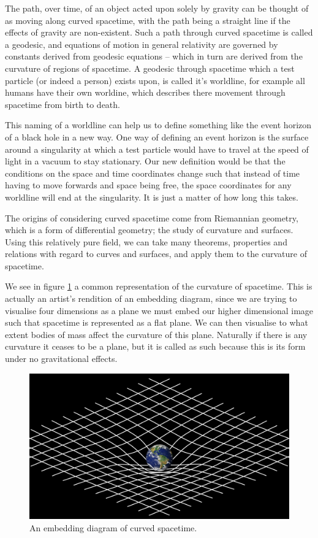 \documentclass[oneside,openright,frontopenright, singlespacing]{dmathesis}
\begin{document}
\vspace{1em}
	The path, over time, of an object acted upon solely by gravity can be thought of as moving along curved spacetime, with the path being a straight line if the effects of gravity are non-existent. Such a path through curved spacetime is called a geodesic, and equations of motion in general relativity are governed by constants derived from geodesic equations – which in turn are derived from the curvature of regions of spacetime. A geodesic through spacetime which a test particle (or indeed a person) exists upon, is called it's worldline, for example all humans have their own worldine, which describes there movement through spacetime from birth to death.

\vspace{1em}
	This naming of a worldline can help us to define something like the event horizon of a black hole in a new way. One way of defining an event horizon is the surface around a singularity at which a test particle would have to travel at the speed of light in a vacuum to stay stationary. Our new definition would be that the conditions on the space and time coordinates change such that instead of time having to move forwards and space being free, the space coordinates for any worldline will end at the singularity. It is just a matter of how long this takes.

\vspace{1em}
	The origins of considering curved spacetime come from Riemannian geometry, which is a form of differential geometry; the study of curvature and surfaces. Using this relatively pure field, we can take many theorems, properties and relations with regard to curves and surfaces, and apply them to the curvature of spacetime.

\vspace{1em}
		We see in figure \ref{fig:Figure2.1} a common representation of the curvature of spacetime. This is actually an artist's rendition of an embedding diagram, since we are trying to visualise four dimensions as a plane we must embed our higher dimensional image such that spacetime is represented as a flat plane. We can then visualise to what extent bodies of mass affect the curvature of this plane. Naturally if there is any curvature it ceases to be a plane, but it is called as such because this is its form under no gravitational effects.

\begin{figure}[!ht]
	\centering
	\includegraphics[width=0.5\linewidth]{img/curved-spacetime}
	\caption{An embedding diagram of curved spacetime.}
	\label{fig:Figure2.1}
\end{figure}
\end{document}
